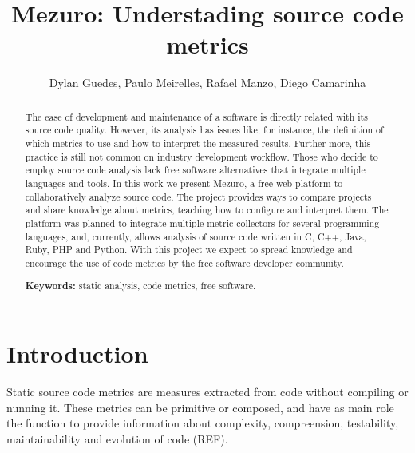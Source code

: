 \documentclass{llncs}
\begin{document}
\sloppy
\title{Mezuro: Understading source code metrics}

\author{Dylan Guedes, Paulo Meirelles,
        Rafael Manzo, Diego Camarinha}



\maketitle
\begin{abstract}
  The ease of development and maintenance of a software is directly related
with its source code quality.
  However, its analysis has issues like, for instance, the definition of which
metrics to use and how to interpret the measured results. Further more, this practice
is still not common on industry development workflow. Those who decide to employ
source code analysis lack free software alternatives that integrate multiple languages
and tools.
In this work we present Mezuro, a free web platform to collaboratively analyze
source code. The project provides ways to compare projects and share knowledge
about metrics, teaching how to configure and interpret them. The platform was
planned to integrate multiple metric collectors for several programming
languages, and, currently, allows analysis of source code written in C, C++,
Java, Ruby, PHP and Python.
    With this project we expect to spread knowledge and encourage the use of
code metrics by the free software developer community.

\textbf{Keywords:} static analysis, code metrics, free software.
\end{abstract}

\section{Introduction}
\label{sec:intro}

Static source code metrics are measures extracted from code without compiling
or nunning it. These metrics can be primitive or composed, and have as main
role the function to provide information about complexity, compreension,
testability, maintainability and evolution of code (REF).
\end{document}
